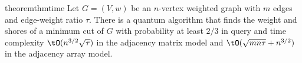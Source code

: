 \begin{restatable}{theorem}{thmtime} \label{thm:time}
Let $G =(V,w)$ be an $n$-vertex weighted graph with $m$ edges and edge-weight ratio $\tau$.  There is a quantum algorithm that finds the weight and shores of a minimum cut of $G$ with probability at least 
$2/3$ in query and time complexity $\tO(n^{3/2}\sqrt{\tau})$ in the adjacency matrix model and $\tO(\sqrt{mn\tau} + n^{3/2})$ in the adjacency array model.
\end{restatable}
